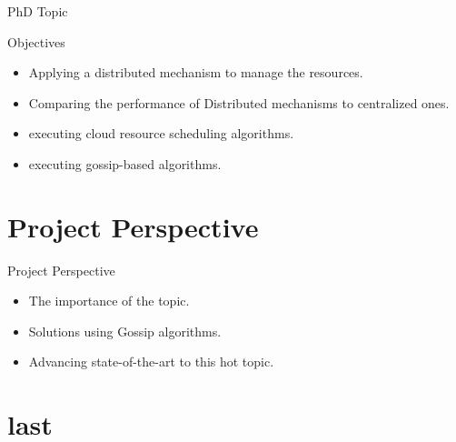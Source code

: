 \documentclass{beamer}
\begin{document}
\begin{frame}{PhD Topic}


\begin{block}{Objectives}
    \begin{itemize}
    
    \item Applying a distributed mechanism to manage the resources. 
    \item<2-> Comparing the performance of Distributed mechanisms to centralized ones. 
    \item<3-> executing cloud resource scheduling algorithms.
    \item<4-> executing gossip-based algorithms.
      
    \end{itemize}
    
    \end{block}
 \end{frame}
    
    

 

\section{Project Perspective}
\begin{frame}{Project Perspective}

    \begin{itemize}
    
    \item The importance of the topic. 
    \item<2-> Solutions using Gossip algorithms. 
    \item<3-> Advancing state-of-the-art to this hot topic. 
    
      
    \end{itemize}
    


\end{frame}


\section*{last}
\end{document}
